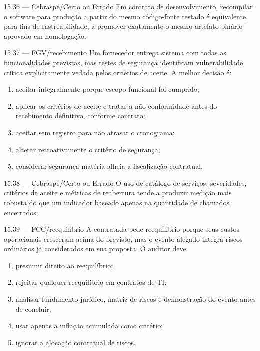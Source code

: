 \begin{questao}{ 15.36 — Cebraspe/Certo ou Errado}
Em contrato de desenvolvimento, recompilar o software para produção a partir do mesmo código-fonte testado é equivalente, para fins de rastreabilidade, a promover exatamente o mesmo artefato binário aprovado em homologação.
\end{questao}

\begin{questao}{ 15.37 — FGV/recebimento}
Um fornecedor entrega sistema com todas as funcionalidades previstas, mas testes de segurança identificam vulnerabilidade crítica explicitamente vedada pelos critérios de aceite. A melhor decisão é:
\begin{enumerate}[label=\Alph*)]
\item aceitar integralmente porque escopo funcional foi cumprido;
\item aplicar os critérios de aceite e tratar a não conformidade antes do recebimento definitivo, conforme contrato;
\item aceitar sem registro para não atrasar o cronograma;
\item alterar retroativamente o critério de segurança;
\item considerar segurança matéria alheia à fiscalização contratual.
\end{enumerate}
\end{questao}

\begin{questao}{ 15.38 — Cebraspe/Certo ou Errado}
O uso de catálogo de serviços, severidades, critérios de aceite e métricas de reabertura tende a produzir medição mais robusta do que um indicador baseado apenas na quantidade de chamados encerrados.
\end{questao}

\begin{questao}{ 15.39 — FCC/reequilíbrio}
A contratada pede reequilíbrio porque seus custos operacionais cresceram acima do previsto, mas o evento alegado integra riscos ordinários já considerados em sua proposta. O auditor deve:
\begin{enumerate}[label=\Alph*)]
\item presumir direito ao reequilíbrio;
\item rejeitar qualquer reequilíbrio em contratos de TI;
\item analisar fundamento jurídico, matriz de riscos e demonstração do evento antes de concluir;
\item usar apenas a inflação acumulada como critério;
\item ignorar a alocação contratual de riscos.
\end{enumerate}
\end{questao}

